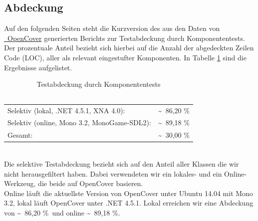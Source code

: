 %



\subsection{Abdeckung}
\label{Abschnitt:Tests:Statistik:Abdeckung}

\newcommand\VSLocalCoverage{\textasciitilde~86,20 \%}

\newcommand\OnlineLocalCoverage{\textasciitilde~89,18 \%}

\newcommand\VSGlobalCoverage{\textasciitilde~30,00 \%}

Auf den folgenden Seiten steht die Kurzversion des aus den Daten von \hyperref[Abschnitt:Tests:Werkzeuge:Automatisiert:OpenCover]{\mousecursor~OpenCover} generierten Berichts zur Testabdeckung durch Komponententests.
Der prozentuale Anteil bezieht sich hierbei auf die Anzahl der abgedeckten Zeilen Code (LOC), aller als relevant eingestufter Komponenten. In Tabelle \ref{Abschnitt:Tests:Statistik:Abdeckung:Tabelle} sind die Ergebnisse aufgelistet.

\begin{longtable}{p{0.75\hsize}p{0.25\hsize}}

	\caption{Testabdeckung durch Komponententests\\~\\}
	\label{Abschnitt:Tests:Statistik:Abdeckung:Tabelle}
	\\

	  Selektiv (lokal, .NET 4.5.1, XNA 4.0):
	& \VSLocalCoverage \\
	
	  Selektiv (online, Mono 3.2, MonoGame-SDL2):
	& \OnlineLocalCoverage \\
	
	  Gesamt:
	& \VSGlobalCoverage \\

\end{longtable}

~\\

Die selektive Testabdeckung bezieht sich auf den Anteil aller Klassen die wir nicht herausgefiltert haben.
Dabei verwendeten wir ein lokales- und ein Online-Werkzeug, die beide auf OpenCover basieren.
~\\

Online läuft die aktuellste Version von OpenCover unter Ubuntu 14.04 mit Mono 3.2, lokal läuft OpenCover unter .NET 4.5.1.
Lokal erreichen wir eine Abdeckung von \VSLocalCoverage~und online \OnlineLocalCoverage.
~\\

